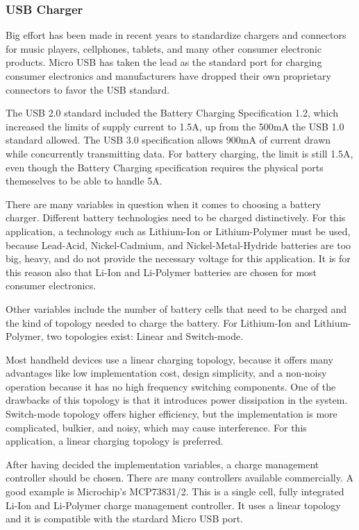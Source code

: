 \subsubsection{USB Charger}
Big effort has been made in recent years to standardize chargers and connectors for music players, cellphones, tablets, and many other consumer electronic products. Micro USB has taken the lead as the standard port for charging consumer electronics and manufacturers have dropped their own proprietary connectors to favor the USB standard.

The USB 2.0 standard included the Battery Charging Specification 1.2, which increased the limits of supply current to 1.5A, up from the 500mA the USB 1.0 standard allowed. The USB 3.0 specification allows 900mA of current drawn while concurrently transmitting data. For battery charging, the limit is still 1.5A, even though the Battery Charging specification requires the physical ports themeselves to be able to handle 5A.

There are many variables in question when it comes to choosing a battery charger. Different battery technologies need to be charged distinctively. For this application, a technology such as Lithium-Ion or Lithium-Polymer must be used, because Lead-Acid, Nickel-Cadmium, and Nickel-Metal-Hydride batteries are too big, heavy, and do not provide the necessary voltage for this application. It is for this reason also that Li-Ion and Li-Polymer batteries are chosen for most consumer electronics.

Other variables include the number of battery cells that need to be charged and the kind of topology needed to charge the battery. For Lithium-Ion and Lithium-Polymer, two topologies exist: Linear and Switch-mode.

Most handheld devices use a linear charging topology, because it offers many advantages like low implementation cost, design simplicity, and a non-noisy operation because it has no high frequency switching components. One of the drawbacks of this topology is that it introduces power dissipation in the system. Switch-mode topology offers higher efficiency, but the implementation is more complicated, bulkier, and noisy, which may cause interference. For this application, a linear charging topology is preferred.

After having decided the implementation variables, a charge management controller should be chosen. There are many controllers available commercially. A good example is Microchip's MCP73831/2. This is a single cell, fully integrated Li-Ion and Li-Polymer charge management controller. It uses a linear topology and it is compatible with the stardard Micro USB port. 

